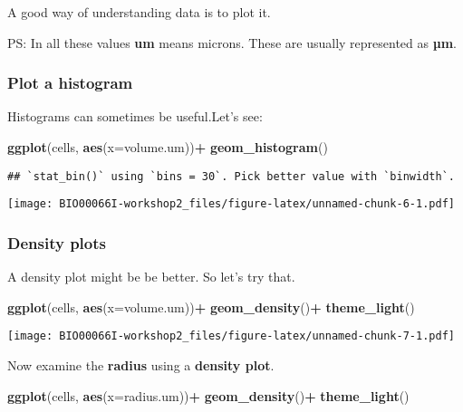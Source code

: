 \documentclass[
]{article}
\newenvironment{Shaded}{\begin{snugshade}}{\end{snugshade}}
\newcommand{\AttributeTok}[1]{\textcolor[rgb]{0.13,0.29,0.53}{#1}}
\newcommand{\FunctionTok}[1]{\textcolor[rgb]{0.13,0.29,0.53}{\textbf{#1}}}
\newcommand{\NormalTok}[1]{#1}
\newcommand{\SpecialCharTok}[1]{\textcolor[rgb]{0.81,0.36,0.00}{\textbf{#1}}}
\begin{document}
A good way of understanding data is to plot it.

PS: In all these values \textbf{um} means microns. These are usually
represented as \textbf{µm}.

\hypertarget{plot-a-histogram}{%
\subsubsection{Plot a histogram}\label{plot-a-histogram}}

Histograms can sometimes be useful.Let's see:

\begin{Shaded}
\begin{Highlighting}[]
\FunctionTok{ggplot}\NormalTok{(cells, }\FunctionTok{aes}\NormalTok{(}\AttributeTok{x=}\NormalTok{volume.um))}\SpecialCharTok{+}
  \FunctionTok{geom\_histogram}\NormalTok{()}
\end{Highlighting}
\end{Shaded}

\begin{verbatim}
## `stat_bin()` using `bins = 30`. Pick better value with `binwidth`.
\end{verbatim}

\texttt{[image: BIO00066I-workshop2\_files/figure-latex/unnamed-chunk-6-1.pdf]}

\hypertarget{density-plots}{%
\subsubsection{Density plots}\label{density-plots}}

A density plot might be be better. So let's try that.

\begin{Shaded}
\begin{Highlighting}[]
\FunctionTok{ggplot}\NormalTok{(cells, }\FunctionTok{aes}\NormalTok{(}\AttributeTok{x=}\NormalTok{volume.um))}\SpecialCharTok{+}
  \FunctionTok{geom\_density}\NormalTok{()}\SpecialCharTok{+}
  \FunctionTok{theme\_light}\NormalTok{()}
\end{Highlighting}
\end{Shaded}

\texttt{[image: BIO00066I-workshop2\_files/figure-latex/unnamed-chunk-7-1.pdf]}

Now examine the \textbf{radius} using a \textbf{density plot}.

\begin{Shaded}
\begin{Highlighting}[]
\FunctionTok{ggplot}\NormalTok{(cells, }\FunctionTok{aes}\NormalTok{(}\AttributeTok{x=}\NormalTok{radius.um))}\SpecialCharTok{+}
  \FunctionTok{geom\_density}\NormalTok{()}\SpecialCharTok{+}
  \FunctionTok{theme\_light}\NormalTok{()}
\end{Highlighting}
\end{Shaded}
\end{document}
